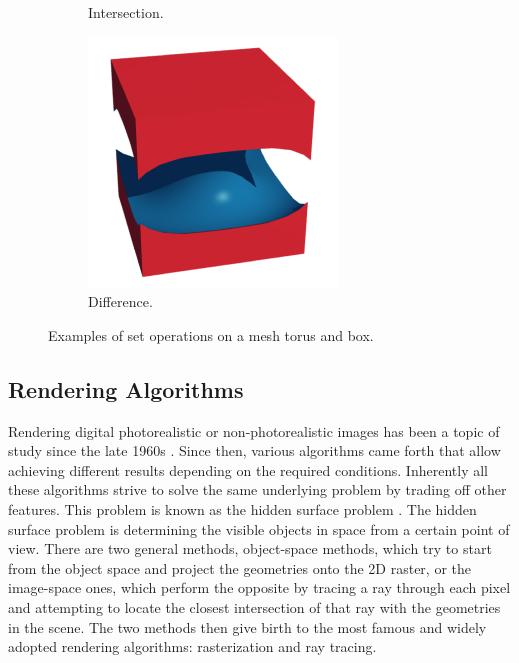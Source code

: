 \documentclass[a4paper,11pt,oneside]{article}
\begin{document}
\begin{figure}[ht]
\begin{subfigure}[b]{0.3\textwidth}
		\caption{Intersection.}
		\label{sec1:intersection}
	\end{subfigure}
	\hfill
	\begin{subfigure}[b]{0.3\textwidth}
		\centering
		\includegraphics[width=\textwidth]{section1/difference.png}
		\caption{Difference.}
		\label{sec1:difference}
	\end{subfigure}
	\hfill
	\caption{Examples of set operations on a mesh torus and box.}
	\label{sec1:set-operations-examples}
\end{figure}

  
\subsection{Rendering Algorithms}
  
Rendering digital photorealistic or non-photorealistic images has been a topic of study since the late 1960s \cite{INITIAL_RENDERING}. Since then, various algorithms came forth that allow achieving different results depending on the required conditions. Inherently all these algorithms strive to solve the same underlying problem by trading off other features. This problem is known as the hidden surface problem \cite{hidden-surface-problem}. The hidden surface problem is determining the visible objects in space from a certain point of view. There are two general methods, object-space methods, which try to start from the object space and project the geometries onto the 2D raster, or the image-space ones, which perform the opposite by tracing a ray through each pixel and attempting to locate the closest intersection of that ray with the geometries in the scene. The two methods then give birth to the most famous and widely adopted rendering algorithms: rasterization and ray tracing.
  
\end{document}

